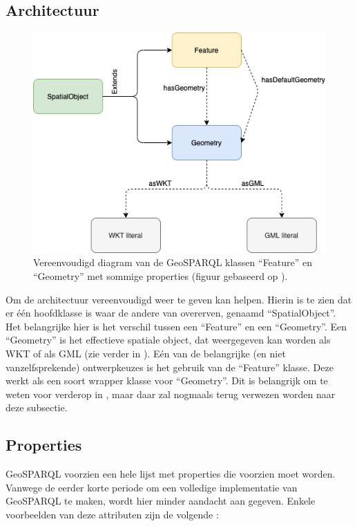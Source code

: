 \subsection{Architectuur}
\label{subsec:geosparql_architecture}
\begin{figure}[ht]
    \centering
    \includegraphics[width=0.7\linewidth]{images/geosparql_architecture.png}
    \caption{Vereenvoudigd diagram van de GeoSPARQL klassen ``Feature'' en ``Geometry'' met sommige properties (figuur gebaseerd op \cite{geosparqlsupport}).}
    \label{fig:geosparql_architecture}
\end{figure}

Om de architectuur vereenvoudigd weer te geven kan  helpen. Hierin is te zien dat er één hoofdklasse is waar de andere van overerven, genaamd ``SpatialObject''. Het belangrijke hier is het verschil tussen een ``Feature'' en een ``Geometry''. Een ``Geometry'' is het effectieve spatiale object, dat weergegeven kan worden als WKT of als GML (zie verder in ). Eén van de belangrijke (en niet vanzelfsprekende) ontwerpkeuzes is het gebruik van de ``Feature'' klasse. Deze werkt als een soort wrapper klasse voor ``Geometry''. Dit is belangrijk om te weten voor verderop in , maar daar zal nogmaals terug verwezen worden naar deze subsectie.

\subsection{Properties}
\label{subsec:geosparql_properties}
GeoSPARQL voorzien een hele lijst met properties die voorzien moet worden. Vanwege de eerder korte periode om een volledige implementatie van GeoSPARQL te maken, wordt hier minder aandacht aan gegeven. Enkele voorbeelden van deze attributen zijn de volgende \cite{ogcdocs}:

